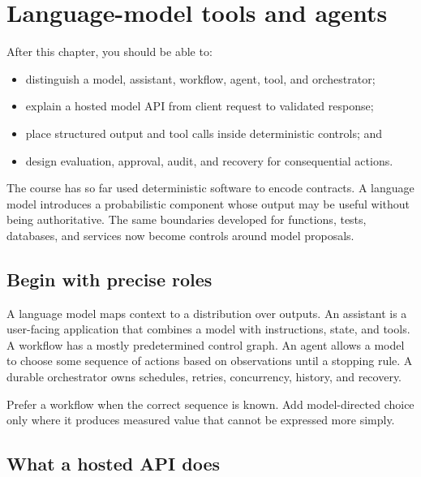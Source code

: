\chapter{Language-model tools and agents}
\label{ch:llm-agents}

\begin{learningobjectives}
After this chapter, you should be able to:
\begin{itemize}
  \item distinguish a model, assistant, workflow, agent, tool, and orchestrator;
  \item explain a hosted model API from client request to validated response;
  \item place structured output and tool calls inside deterministic controls; and
  \item design evaluation, approval, audit, and recovery for consequential actions.
\end{itemize}
\end{learningobjectives}

\begin{chapterconnection}
The course has so far used deterministic software to encode contracts. A
language model introduces a probabilistic component whose output may be useful
without being authoritative. The same boundaries developed for functions,
tests, databases, and services now become controls around model proposals.
\end{chapterconnection}

\section{Begin with precise roles}

A language model maps context to a distribution over outputs. An assistant is a
user-facing application that combines a model with instructions, state, and
tools. A workflow has a mostly predetermined control graph. An agent allows a
model to choose some sequence of actions based on observations until a stopping
rule. A durable orchestrator owns schedules, retries, concurrency, history, and
recovery.

Prefer a workflow when the correct sequence is known. Add model-directed choice
only where it produces measured value that cannot be expressed more simply.

\section{What a hosted API does}

